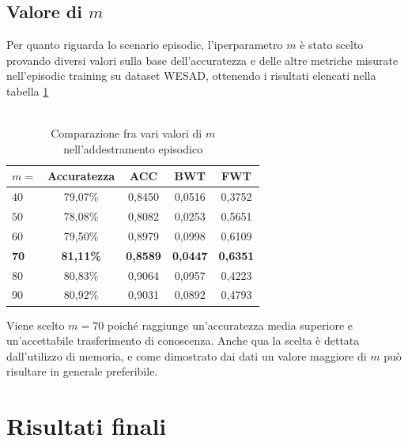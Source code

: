 \subsection{Valore di $m$}
Per quanto riguarda lo scenario episodic, l'iperparametro $m$ è stato scelto provando diversi valori sulla base dell'accuratezza e delle altre metriche misurate nell'episodic training su dataset WESAD, ottenendo i risultati elencati nella tabella \ref{tab:episodicmtest}\\\\
\begin{table}[h]
    \begin{center}
        \begin{tabular}{l|c|c|c|c}
            \textbf{$m =$} & \textbf{Accuratezza} & \textbf{ACC} & \textbf{BWT} & \textbf{FWT}\\
            \hline
            $40$ & 79,07\% & 0,8450 & 0,0516 & 0,3752\\
            $50$ & 78,08\% & 0,8082 & 0,0253 & 0,5651\\
            $60$ & 79,50\% & 0,8979 & 0,0998 & 0,6109\\
            \textbf{70} & \textbf{81,11\%} & \textbf{0,8589} & \textbf{0,0447} & \textbf{0,6351}\\
            $80$ & 80,83\% & 0,9064 & 0,0957 & 0,4223\\
            $90$ & 80,92\% & 0,9031 & 0,0892 & 0,4793
        \end{tabular}
        \caption{Comparazione fra vari valori di $m$ nell'addestramento episodico}
        \label{tab:episodicmtest}
    \end{center}
\end{table}

Viene scelto $m = 70$ poiché raggiunge un'accuratezza media superiore e un'accettabile trasferimento di conoscenza. Anche qua la scelta è dettata dall'utilizzo di memoria, e come dimostrato dai dati un valore maggiore di $m$ può risultare in generale preferibile.

\section{Risultati finali}
